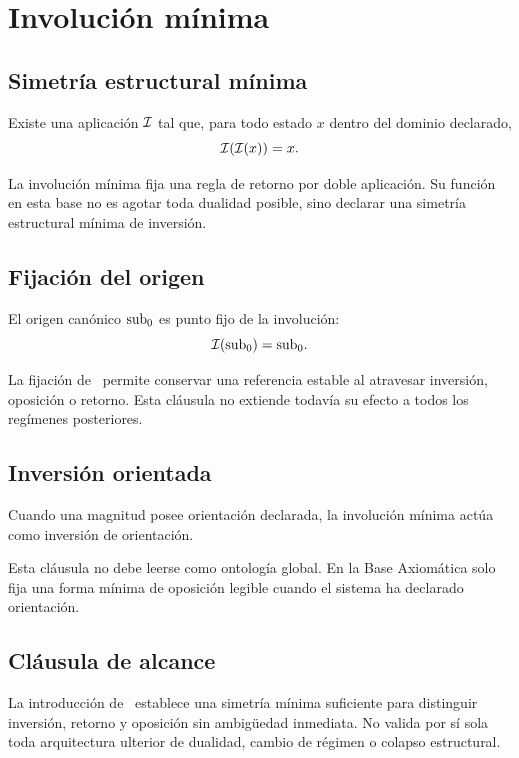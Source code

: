 \chapter{Involución mínima}

\section{Simetría estructural mínima}
\begin{axiom}
Existe una aplicación \(\mathcal I\) tal que, para todo estado \(x\) dentro del dominio declarado,
\[
\mathcal I(\mathcal I(x)) = x.
\]
\end{axiom}

\begin{observation}
La involución mínima fija una regla de retorno por doble aplicación. Su función en esta base no es agotar toda dualidad posible, sino declarar una simetría estructural mínima de inversión.
\end{observation}

\section{Fijación del origen}
\begin{axiom}
El origen canónico \(\mathrm{sub}_{0}\) es punto fijo de la involución:
\[
\mathcal I(\mathrm{sub}_{0})=\mathrm{sub}_{0}.
\]
\end{axiom}

\begin{observation}
La fijación de \subz\ permite conservar una referencia estable al atravesar inversión, oposición o retorno. Esta cláusula no extiende todavía su efecto a todos los regímenes posteriores.
\end{observation}

\section{Inversión orientada}
\begin{axiom}
Cuando una magnitud posee orientación declarada, la involución mínima actúa como inversión de orientación.
\end{axiom}

\begin{observation}
Esta cláusula no debe leerse como ontología global. En la Base Axiomática solo fija una forma mínima de oposición legible cuando el sistema ha declarado orientación.
\end{observation}

\section{Cláusula de alcance}
\begin{observation}
La introducción de \Iop\ establece una simetría mínima suficiente para distinguir inversión, retorno y oposición sin ambigüedad inmediata. No valida por sí sola toda arquitectura ulterior de dualidad, cambio de régimen o colapso estructural.
\end{observation}

